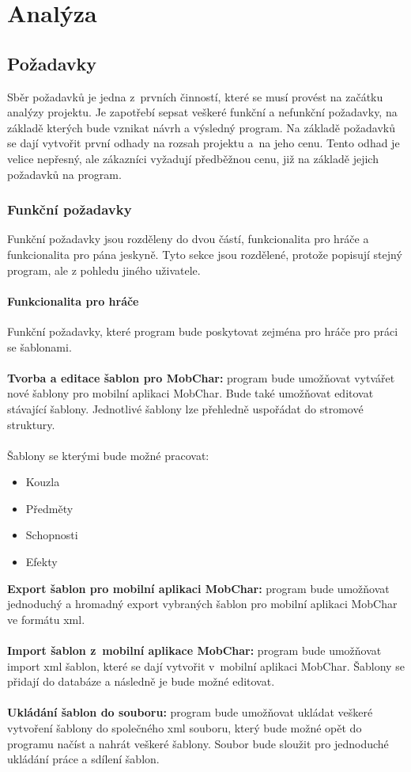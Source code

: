 \documentclass[thesis=B,czech]{resources/FITthesis}[2012/06/26]
\begin{document}
\chapter{Analýza}
	\section{Požadavky}



Sběr požadavků je jedna z~prvních činností, které se musí provést na začátku analýzy projektu. Je zapotřebí sepsat veškeré funkční a nefunkční požadavky, na základě kterých bude vznikat návrh a výsledný program. Na základě požadavků se dají vytvořit první odhady na rozsah projektu a~na jeho cenu. Tento odhad je velice nepřesný, ale zákazníci vyžadují předběžnou cenu, již na základě jejich požadavků na program. 
	
\subsection{Funkční požadavky}
Funkční požadavky jsou rozděleny do dvou částí, funkcionalita pro hráče a funkcionalita pro pána jeskyně. Tyto sekce jsou rozdělené, protože popisují stejný program, ale z pohledu jiného uživatele.
\subsubsection{Funkcionalita pro hráče}
Funkční požadavky, které program bude poskytovat zejména pro hráče pro práci se šablonami.\\
\\
\textbf{Tvorba a editace šablon pro MobChar:} program bude umožňovat vytvářet nové šablony pro mobilní aplikaci MobChar. Bude také umožňovat editovat stávající šablony. Jednotlivé šablony lze přehledně uspořádat do stromové struktury.\\
\\
Šablony se kterými bude možné pracovat:
				\begin{itemize}
					\item Kouzla
					\item Předměty
					\item Schopnosti
					\item Efekty
				\end{itemize}
\textbf{Export šablon pro mobilní aplikaci MobChar:} program bude umožňovat jednoduchý a hromadný export vybraných šablon pro mobilní aplikaci MobChar ve formátu xml.\\
\\
\textbf{Import šablon z~mobilní aplikace MobChar:} program bude umožňovat import xml šablon, které se dají vytvořit v~mobilní aplikaci MobChar. Šablony se přidají do databáze a následně je bude možné editovat.\\
\\
\textbf{Ukládání šablon do souboru:} program bude umožňovat ukládat veškeré vytvoření šablony do společného xml souboru, který bude možné opět do programu načíst a nahrát veškeré šablony. Soubor bude sloužit pro jednoduché ukládání práce a sdílení šablon.
\end{document}
